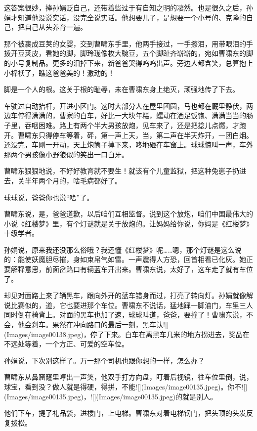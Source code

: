 \documentclass[lang=cn,newtx,12pt,scheme=chinese]{elegantbook}
\begin{document}
这答案很妙，捧孙娟贬自己，还带着些过于有自知之明的凄然。也是很久之后，孙娟才知道他没说实话，没完全说实话。他想要儿子，是想要一个小号的、克隆的自己，把自己从头养育一遍。

那个被裹成豆荚的女婴，交到曹啸东手里，他两手接过，一手擦泪，用带眼泪的手拨开豆荚皮，看她的脚，脚玲珑像枚大豌豆，五个脚趾齐崭崭的，宛如曹啸东的脚的小号复制品。更多的泪掉下来，新爸爸哭得呜呜出声。旁边人都含笑，总算抱上小棉袄了，瞧这爸爸美的！激动的！

脚是一个人的根。这关于根的耻辱，未在曹啸东身上绝灭，顽强地传了下去。

车驶过自动抬杆，开进小区门。这时大部分人在屋里团圆，马也都在厩里静伏，两边车停得满满的，曹家的白车，好比一大块年糕，蠕动在酒足饭饱、满满当当的肠子里，吞咽困难。路上有两个半大男孩放炮，见车来了，还是把捻儿点燃，才跑开。曹啸东只得停车等着，砰，第一声上天，当，第二声在半天炸开，一团白烟。还没完，车刚一开动，天上炮筒子掉下来，咚地砸在车窗上。球球惊叫一声，车外那两个男孩像小野狼似的笑出一口白牙。

曹啸东狠狠地说，不好好教育就不要生！就该有个儿童监狱，把这种兔崽子扔进去，关半年两个月的，啥毛病都好了。

球球说，爸爸你也说“啥”了。

曹啸东说，是，爸爸道歉，以后咱们互相监督。说到这个放炮，咱们中国最伟大的小说《红楼梦》里，有个灯谜就是关于放炮的。让妈妈给你说，你妈是《红楼梦》十级学者。

孙娟说，原来我还没那么俗哦？我还懂《红楼梦》呢……嗯，那个灯谜是这么说的：能使妖魔胆尽摧，身如束帛气如雷。一声震得人方恐，回首相看已化灰。她正要解释意思，前面岔路口有辆蓝车开出来。曹啸东说，太好了，这车走了就有车位了。

却见对面路上来了辆黑车，跟向外开的蓝车错身而过，打亮了转向灯。孙娟就像解说比赛似的，道，它也要进那个车位。曹啸东不说话，猛地踩一脚油门，车里三人同时倒在椅背上。对面的黑车也加了速，球球叫道，爸爸，要撞了！曹啸东说，不会，他会刹车。果然在冲向路口的最后一刻，黑车认![](Images/image00138.jpeg)，停了下来。白车在离黑车几米的地方拐进去，奖品在不远处等着，一个方正、可爱的空车位。

孙娟说，下次别这样了。万一那个司机也跟你想的一样，怎么办？

曹啸东从鼻窟窿里哼出一声笑，他双手打方向盘，盯着后视镜，往车位里倒，说，球宝，看到没？做人就是得硬，得拼，不能![](Images/image00135.jpeg)。你不![](Images/image00135.jpeg)，![](Images/image00135.jpeg)的就是别人。

他们下车，提了礼品袋，进楼门，上电梯。曹啸东对着电梯钢门，把头顶的头发反复拨松。
\end{document}
